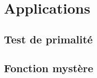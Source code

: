 \section{Applications}
\subsection{Test de primalité}
\setcounter{thequestion}{0}

\subsection{Fonction mystère}
\setcounter{thequestion}{0}

